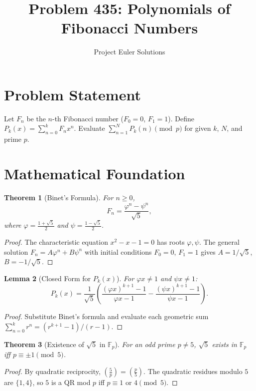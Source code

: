 \documentclass[11pt]{article}
\title{Problem 435: Polynomials of Fibonacci Numbers}
\author{Project Euler Solutions}
\date{}
\newtheorem{theorem}{Theorem}
\newtheorem{lemma}[theorem]{Lemma}
\begin{document}
\maketitle

\section{Problem Statement}
Let $F_n$ be the $n$-th Fibonacci number ($F_0 = 0$, $F_1 = 1$). Define $P_k(x) = \sum_{n=0}^{k} F_n x^n$. Evaluate $\sum_{n=1}^{N} P_k(n) \pmod{p}$ for given $k$, $N$, and prime $p$.

\section{Mathematical Foundation}

\begin{theorem}[Binet's Formula]
For $n \geq 0$,
\[
F_n = \frac{\varphi^n - \psi^n}{\sqrt{5}},
\]
where $\varphi = \frac{1+\sqrt{5}}{2}$ and $\psi = \frac{1-\sqrt{5}}{2}$.
\end{theorem}

\begin{proof}
The characteristic equation $x^2 - x - 1 = 0$ has roots $\varphi, \psi$. The general solution $F_n = A\varphi^n + B\psi^n$ with initial conditions $F_0 = 0$, $F_1 = 1$ gives $A = 1/\sqrt{5}$, $B = -1/\sqrt{5}$.
\end{proof}

\begin{lemma}[Closed Form for $P_k(x)$]
For $\varphi x \neq 1$ and $\psi x \neq 1$:
\[
P_k(x) = \frac{1}{\sqrt{5}} \left( \frac{(\varphi x)^{k+1} - 1}{\varphi x - 1} - \frac{(\psi x)^{k+1} - 1}{\psi x - 1} \right).
\]
\end{lemma}

\begin{proof}
Substitute Binet's formula and evaluate each geometric sum $\sum_{n=0}^{k} r^n = (r^{k+1}-1)/(r-1)$.
\end{proof}

\begin{theorem}[Existence of $\sqrt{5}$ in $\mathbb{F}_p$]
For an odd prime $p \neq 5$, $\sqrt{5}$ exists in $\mathbb{F}_p$ iff $p \equiv \pm 1 \pmod{5}$.
\end{theorem}

\begin{proof}
By quadratic reciprocity, $\left(\frac{5}{p}\right) = \left(\frac{p}{5}\right)$. The quadratic residues modulo $5$ are $\{1, 4\}$, so $5$ is a QR mod $p$ iff $p \equiv 1$ or $4 \pmod{5}$.
\end{proof}
\end{document}
